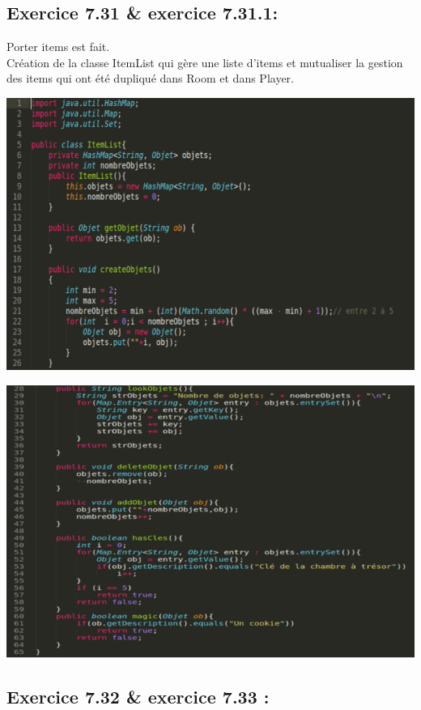 \documentclass[french,10pt,a4paper]{report}
\begin{document}
\subsection{\textcolor{bb}{Exercice 7.31 \& exercice 7.31.1:}}
Porter items  est fait.\\
Création de la classe ItemList qui gère une liste d'items et  mutualiser la gestion des items qui ont  été dupliqué dans Room et dans Player.
\begin{center}
	\includegraphics[scale=0.4]{captures/it3_5.png}
\end{center}
\begin{center}
	\includegraphics[scale=0.4]{captures/it3_6.png}
\end{center}
\subsection{\textcolor{bb}{Exercice 7.32 \& exercice 7.33 :}}
\end{document}
